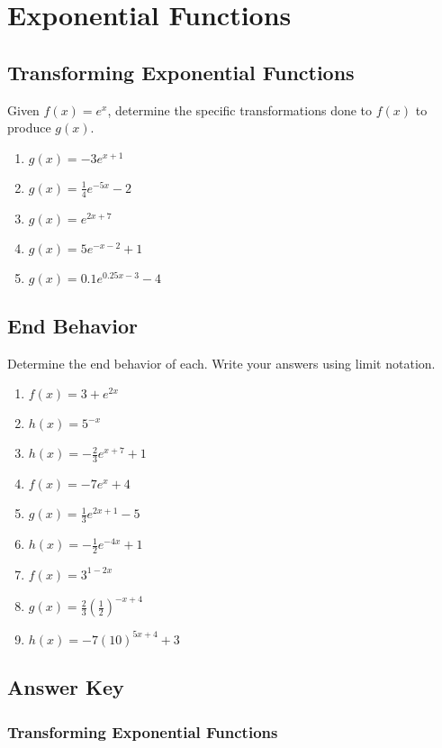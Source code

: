 \chapter{Exponential Functions}


\section{Transforming Exponential Functions}

Given $f(x) = e^x$, determine the specific transformations done to $f(x)$ to produce $g(x)$.
\begin{enumerate}
	\item $g(x) = -3e^{x+1}$
	\item $g(x) = \frac{1}{4}e^{-5x} - 2$
	\item $g(x) = e^{2x+7}$
	\item $g(x) = 5e^{-x-2} + 1$
	\item $g(x) = 0.1e^{0.25x-3} - 4$
\end{enumerate}	

\section{End Behavior}

Determine the end behavior of each. Write your answers using limit notation.
\begin{enumerate}
	\item $f(x) = 3 + e^{2x}$
	\item $h(x) = 5^{-x}$
	\item $h(x) = -\frac{2}{3}e^{x+7} + 1$
	\item $f(x) = -7e^x + 4$
	\item $g(x) = \frac{1}{3}e^{2x+1}-5$
	\item $h(x) = -\frac{1}{2}e^{-4x} + 1$
	\item $f(x) = 3^{1-2x}$
	\item $g(x) = \frac{2}{3}\left(\frac{1}{2}\right)^{-x+4}$
	\item $h(x) = -7 (10)^{5x+4}+3$
\end{enumerate}

\newpage

\section{Answer Key}

\subsection*{Transforming Exponential Functions}

